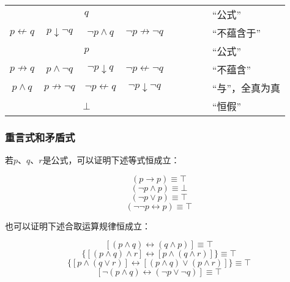 \begin{table}[h!]
\begin{tabular}{c c c c c c c c l}
        \multicolumn{4}{c}{$q$}                                                                           & \F   & \T   & \F   & \T   & ``公式''           \\
        $p\not\gets{}q$  & $p\downarrow\lnot{}q$ & $\lnot{}p\land{}q$      & $\lnot{}p\not\to\lnot{}q$    & \F   & \T   & \F   & \F   & ``不蕴含于''       \\
        \multicolumn{4}{c}{$p$}                                                                           & \F   & \F   & \T   & \T   & ``公式''           \\
        $p\not\to{}q$    & $p\land\lnot{}q$      & $\lnot{}p\downarrow{}q$ & $\lnot{}p\not\gets\lnot{}q$  & \F   & \F   & \T   & \F   & ``不蕴含''         \\
        $p\land{}q$      & $p\not\to\lnot{}q$    & $\lnot{}p\not\gets{}q$  & $\lnot{}p\downarrow\lnot{}q$ & \F   & \F   & \F   & \T   & ``与''，全真为真   \\
        \multicolumn{4}{c}{$\bot$}                                                                        & \F   & \F   & \F   & \F   & ``恒假''           \\
        \hline
    \end{tabular}
\end{table}

\subsubsection{重言式和矛盾式}

若$p$、$q$、$r$是公式，可以证明下述等式恒成立：

\[ (p \to p)                                                               \equiv \top \tag{同一律} \]
\[ (\lnot{}p \land p)                                                      \equiv \bot \tag{矛盾律} \]
\[ (\lnot{}p \lor p)                                                       \equiv \top \tag{排中律} \]
\[ (\lnot\lnot{}p \leftrightarrow p)                                       \equiv \top \tag{双重否定律} \]

也可以证明下述合取运算规律恒成立：

\[ [(p \land q) \leftrightarrow (q \land p)]                               \equiv \top \tag{合取交换律} \]
\[ \{[(p \land q) \land r] \leftrightarrow [p \land (q \land r)]\}         \equiv \top \tag{合取结合律} \]
\[ \{[p \land (q \lor r)] \leftrightarrow [(p \land q) \lor (p \land r)]\} \equiv \top \tag{合取分配律} \]
\[ [\lnot(p \land q) \leftrightarrow (\lnot{}p \lor \lnot{}q)]             \equiv \top \tag{合取德·摩根律} \]

